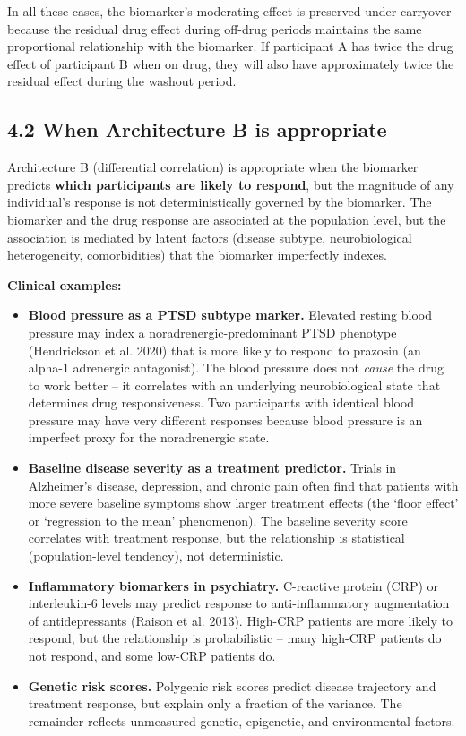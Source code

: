 \documentclass[11pt]{article}
\begin{document}
In all these cases, the biomarker's moderating effect is
preserved under carryover because the residual drug effect during
off-drug periods maintains the same proportional relationship
with the biomarker. If participant A has twice the drug effect of
participant B when on drug, they will also have approximately
twice the residual effect during the washout period.

\subsection{4.2 When Architecture B is appropriate}

Architecture B (differential correlation) is appropriate when
the biomarker predicts \textbf{which participants are likely to
respond}, but the magnitude of any individual's response is not
deterministically governed by the biomarker. The biomarker and
the drug response are associated at the population level, but
the association is mediated by latent factors (disease subtype,
neurobiological heterogeneity, comorbidities) that the biomarker
imperfectly indexes.

\textbf{Clinical examples:}

\begin{itemize}
\item \textbf{Blood pressure as a PTSD subtype marker.} Elevated resting
  blood pressure may index a noradrenergic-predominant PTSD
  phenotype (Hendrickson et al. 2020) that is more likely to
  respond to prazosin (an alpha-1 adrenergic antagonist). The
  blood pressure does not \textit{cause} the drug to work better --
  it correlates with an underlying neurobiological state that
  determines drug responsiveness. Two participants with
  identical blood pressure may have very different responses
  because blood pressure is an imperfect proxy for the
  noradrenergic state.

\item \textbf{Baseline disease severity as a treatment predictor.} Trials
  in Alzheimer's disease, depression, and chronic pain often
  find that patients with more severe baseline symptoms show
  larger treatment effects (the `floor effect' or `regression
  to the mean' phenomenon). The baseline severity score
  correlates with treatment response, but the relationship is
  statistical (population-level tendency), not deterministic.

\item \textbf{Inflammatory biomarkers in psychiatry.} C-reactive protein
  (CRP) or interleukin-6 levels may predict response to
  anti-inflammatory augmentation of antidepressants (Raison
  et al. 2013). High-CRP patients are more likely to respond,
  but the relationship is probabilistic -- many high-CRP
  patients do not respond, and some low-CRP patients do.

\item \textbf{Genetic risk scores.} Polygenic risk scores predict disease
  trajectory and treatment response, but explain only a fraction
  of the variance. The remainder reflects unmeasured genetic,
  epigenetic, and environmental factors.
\end{itemize}
\end{document}
